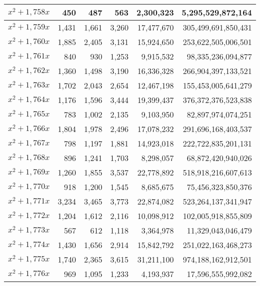 \documentclass[a4paper]{amsproc}
\theoremstyle{plain}
\begin{document}
\begin{longtable}{ | l | r | r | r | r | r | }
$x^2 + 1{,}758x$ & 450 & 487 & 563 & 2{,}300{,}323 & 5{,}295{,}529{,}872{,}164 \\ \hline
$x^2 + 1{,}759x$ & 1{,}431 & 1{,}661 & 3{,}260 & 17{,}477{,}670 & 305{,}499{,}691{,}850{,}431 \\ \hline
$x^2 + 1{,}760x$ & 1{,}885 & 2{,}405 & 3{,}131 & 15{,}924{,}650 & 253{,}622{,}505{,}006{,}501 \\ \hline
$x^2 + 1{,}761x$ & 840 & 930 & 1{,}253 & 9{,}915{,}532 & 98{,}335{,}236{,}094{,}877 \\ \hline
$x^2 + 1{,}762x$ & 1{,}360 & 1{,}498 & 3{,}190 & 16{,}336{,}328 & 266{,}904{,}397{,}133{,}521 \\ \hline
$x^2 + 1{,}763x$ & 1{,}702 & 2{,}043 & 2{,}654 & 12{,}467{,}198 & 155{,}453{,}005{,}641{,}279 \\ \hline
$x^2 + 1{,}764x$ & 1{,}176 & 1{,}596 & 3{,}444 & 19{,}399{,}437 & 376{,}372{,}376{,}523{,}838 \\ \hline
$x^2 + 1{,}765x$ & 783 & 1{,}002 & 2{,}135 & 9{,}103{,}950 & 82{,}897{,}974{,}074{,}251 \\ \hline
$x^2 + 1{,}766x$ & 1{,}804 & 1{,}978 & 2{,}496 & 17{,}078{,}232 & 291{,}696{,}168{,}403{,}537 \\ \hline
$x^2 + 1{,}767x$ & 798 & 1{,}197 & 1{,}881 & 14{,}923{,}018 & 222{,}722{,}835{,}201{,}131 \\ \hline
$x^2 + 1{,}768x$ & 896 & 1{,}241 & 1{,}703 & 8{,}298{,}057 & 68{,}872{,}420{,}940{,}026 \\ \hline
$x^2 + 1{,}769x$ & 1{,}260 & 1{,}855 & 3{,}537 & 22{,}778{,}892 & 518{,}918{,}216{,}607{,}613 \\ \hline
$x^2 + 1{,}770x$ & 918 & 1{,}200 & 1{,}545 & 8{,}685{,}675 & 75{,}456{,}323{,}850{,}376 \\ \hline
$x^2 + 1{,}771x$ & 3{,}234 & 3{,}465 & 3{,}773 & 22{,}874{,}082 & 523{,}264{,}137{,}341{,}947 \\ \hline
$x^2 + 1{,}772x$ & 1{,}204 & 1{,}612 & 2{,}116 & 10{,}098{,}912 & 102{,}005{,}918{,}855{,}809 \\ \hline
$x^2 + 1{,}773x$ & 567 & 612 & 1{,}118 & 3{,}364{,}978 & 11{,}329{,}043{,}046{,}479 \\ \hline
$x^2 + 1{,}774x$ & 1{,}430 & 1{,}656 & 2{,}914 & 15{,}842{,}792 & 251{,}022{,}163{,}468{,}273 \\ \hline
$x^2 + 1{,}775x$ & 1{,}740 & 2{,}365 & 3{,}615 & 31{,}211{,}100 & 974{,}188{,}162{,}912{,}501 \\ \hline
$x^2 + 1{,}776x$ & 969 & 1{,}095 & 1{,}233 & 4{,}193{,}937 & 17{,}596{,}555{,}992{,}082 \\ \hline

\end{longtable}
\end{document}
